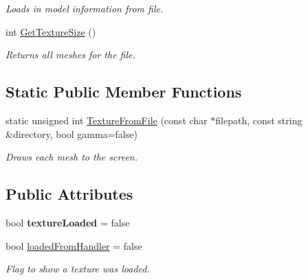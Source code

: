 \begin{DoxyCompactItemize}
\begin{DoxyCompactList}\small\item\em Loads in model information from file. \end{DoxyCompactList}\item 
\hypertarget{class_model_a6e6ff4851692b4eb499108c7c4df6da3}{int \hyperlink{class_model_a6e6ff4851692b4eb499108c7c4df6da3}{Get\+Texture\+Size} ()}\label{class_model_a6e6ff4851692b4eb499108c7c4df6da3}

\begin{DoxyCompactList}\small\item\em Returns all meshes for the file. \end{DoxyCompactList}\end{DoxyCompactItemize}
\subsection*{Static Public Member Functions}
\begin{DoxyCompactItemize}
\item 
\hypertarget{class_model_a16c263d87f6368d21d5ab255468c2c90}{static unsigned int \hyperlink{class_model_a16c263d87f6368d21d5ab255468c2c90}{Texture\+From\+File} (const char $\ast$filepath, const string \&directory, bool gamma=false)}\label{class_model_a16c263d87f6368d21d5ab255468c2c90}

\begin{DoxyCompactList}\small\item\em Draws each mesh to the screen. \end{DoxyCompactList}\end{DoxyCompactItemize}
\subsection*{Public Attributes}
\begin{DoxyCompactItemize}
\item 
\hypertarget{class_model_a1c0adafee07d69e3d3c87f09bbbb1f47}{bool {\bfseries texture\+Loaded} = false}\label{class_model_a1c0adafee07d69e3d3c87f09bbbb1f47}

\item 
\hypertarget{class_model_a966cb2bef7912d9cda8884eaa17242b6}{bool \hyperlink{class_model_a966cb2bef7912d9cda8884eaa17242b6}{loaded\+From\+Handler} = false}\label{class_model_a966cb2bef7912d9cda8884eaa17242b6}

\begin{DoxyCompactList}\small\item\em Flag to show a texture was loaded. \end{DoxyCompactList}\end{DoxyCompactItemize}


